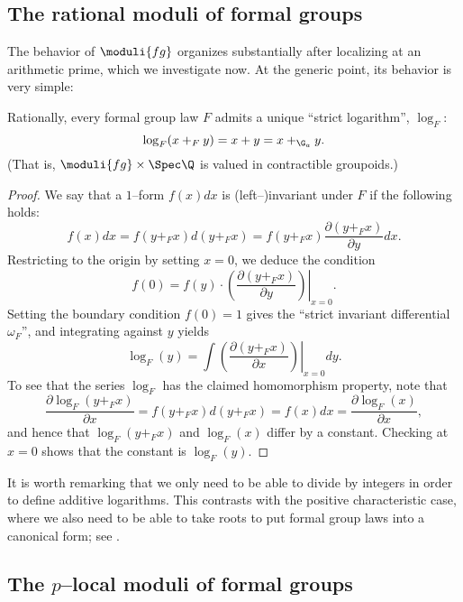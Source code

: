 \subsection*{The rational moduli of formal groups}

The behavior of $\moduli{fg}$ organizes substantially after localizing at an arithmetic prime, which we investigate now.  At the generic point, its behavior is very simple:

\begin{lemma}\label{RationalFGLsHaveLogs}
Rationally, every formal group law $F$ admits a unique ``strict logarithm'', $\log_F$: \[\log_F(x +_F y) = x + y = x +_{\G_a} y.\]  (That is, $\moduli{fg} \times \Spec \Q$ is valued in contractible groupoids.)
\end{lemma}
\begin{proof}
We say that a $1$--form $f(x) dx$ is (left--)invariant under $F$ if the following holds: \[f(x) dx = f(y +_F x) d(y +_F x) = f(y +_F x) \frac{\partial(y +_F x)}{\partial y} dx.\]  Restricting to the origin by setting $x = 0$, we deduce the condition \[f(0) = f(y) \cdot \left.\left( \frac{\partial( y +_F x)}{\partial y} \right) \right|_{x=0}.\]  Setting the boundary condition $f(0) = 1$ gives the ``strict invariant differential $\omega_F$'', and integrating against $y$ yields \[\log_F(y) = \int \left. \left( \frac{\partial(y +_F x)}{\partial x} \right)\right|_{x=0} dy.\]  To see that the series $\log_F$ has the claimed homomorphism property, note that \[\frac{\partial \log_F(y +_F x)}{\partial x} = f(y +_F x) d(y +_F x) = f(x) dx = \frac{\partial \log_F(x)}{\partial x},\] and hence that $\log_F(y +_F x)$ and $\log_F(x)$ differ by a constant.  Checking at $x = 0$ shows that the constant is $\log_F(y)$.
\end{proof}

\begin{remark}
It is worth remarking that we only need to be able to divide by integers in order to define additive logarithms.  This contrasts with the positive characteristic case, where we also need to be able to take roots to put formal group laws into a canonical form; see .
\end{remark}

\subsection*{The $p$--local moduli of formal groups}

